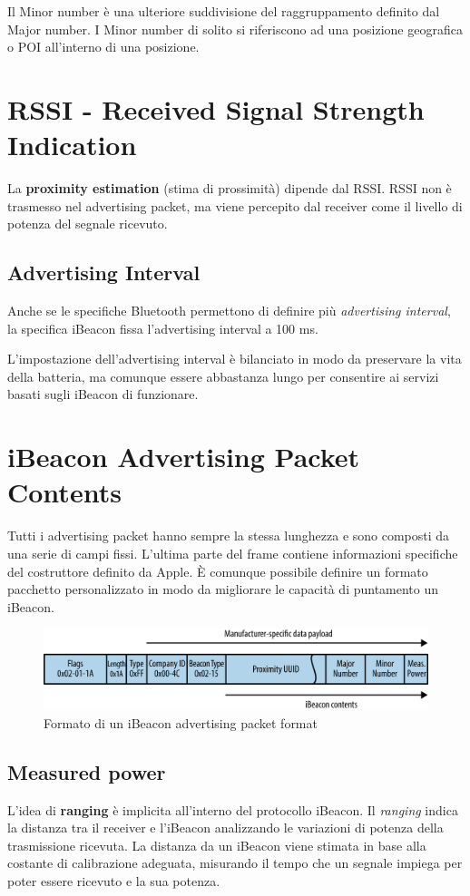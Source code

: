 Il Minor number è una ulteriore suddivisione del raggruppamento definito dal Major number. I Minor number di solito si riferiscono ad una posizione geografica o POI all'interno di una posizione.

\section{RSSI - Received Signal Strength Indication}
La \textbf{proximity estimation} (stima di prossimità) dipende dal RSSI. RSSI non è trasmesso nel advertising packet, ma viene percepito dal receiver come il livello di potenza del segnale ricevuto.

\subsection{Advertising Interval}
Anche se le specifiche Bluetooth permettono di definire più \textit{advertising interval}, la specifica iBeacon fissa l'advertising interval a 100 ms.

L'impostazione dell'advertising interval è bilanciato in modo da preservare la vita della batteria, ma comunque essere abbastanza lungo per consentire ai servizi basati sugli iBeacon di funzionare.

\section{iBeacon Advertising Packet Contents}
Tutti i advertising packet hanno sempre la stessa lunghezza e sono composti da una serie di campi fissi. L'ultima parte del frame contiene informazioni specifiche del costruttore definito da Apple. È comunque possibile definire un formato pacchetto personalizzato in modo da migliorare le capacità di puntamento un iBeacon.

\begin{figure}[!ht]
	\centering
	\includegraphics[scale=.25]{img/bt/iBeacon_advertising_packet_format.png}
	\caption{Formato di un iBeacon advertising packet format}
\end{figure}

\subsection{Measured power}
L'idea di \textbf{ranging} è implicita all'interno del protocollo iBeacon. Il \textit{ranging} indica la distanza tra il receiver e l'iBeacon analizzando le variazioni di potenza della trasmissione ricevuta. La distanza da un iBeacon viene stimata in base alla costante di calibrazione adeguata, misurando il tempo che un segnale impiega per poter essere ricevuto e la sua potenza.

